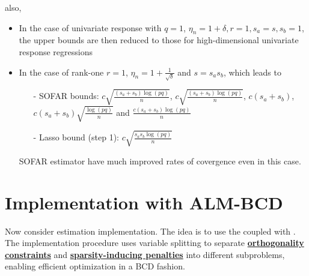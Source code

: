 \documentclass[twoside]{article}
\begin{document}
also,
\begin{itemize}
    \item In the case of univariate response with $q=1$, $\eta_n=1+\delta,r=1,s_a=s,s_b=1$, the upper bounds are then reduced to those for high-dimensional univariate response regressions
    \item In the case of rank-one $r=1$, $\eta_n = 1+\frac{1}{\sqrt{\delta}}$ and $s=s_as_b$, which leads to
    \begin{itemize}
        \item[-] SOFAR bounds: $c\sqrt{\frac{(s_a+s_b)\log(pq)}{n}}$, $c\sqrt{\frac{(s_a+s_b)\log(pq)}{n}}$, $c(s_a+s_b)$, $c(s_a+s_b)\sqrt{\frac{\log(pq)}{n}}$ and $\frac{c(s_a+s_b)\log(pq)}{n}$
        \item[-] Lasso bound (step 1): $c\sqrt{\frac{s_as_b\log(pq)}{n}}$
    \end{itemize}
    SOFAR estimator have much improved rates of covergence even in this case.
\end{itemize}

\section{Implementation with ALM-BCD}
Now consider estimation implementation. The idea is to use the  coupled with . The implementation procedure uses variable splitting to separate \underline{\textbf{orthogonality constraints}} and \underline{\textbf{sparsity-inducing penalties}} into different subproblems, enabling efficient optimization in a BCD fashion.
\end{document}
